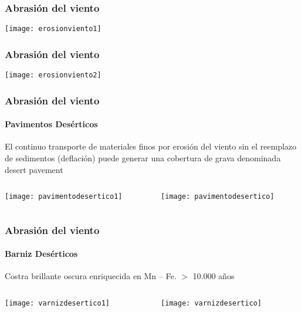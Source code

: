 \documentclass{beamer}
\begin{document}
\begin{frame}
\frametitle{Abrasión del viento}
\begin{center}
\texttt{[image: erosionviento1]}
\end{center}
\end{frame}
\begin{frame}
\frametitle{Abrasión del viento}
\begin{center}
\texttt{[image: erosionviento2]}
\end{center}
\end{frame}
\begin{frame}
\frametitle{Abrasión del viento}
\framesubtitle{Pavimentos Desérticos}
\small{El continuo transporte de materiales finos por erosión del viento sin el reemplazo de sedimentos (deflación) puede generar una cobertura de grava denominada desert pavement}
\begin{columns}
\begin{column}{0.5\linewidth}
\begin{center}
\texttt{[image: pavimentodesertico1]}
\end{center}
\end{column}
\begin{column}{0.5\linewidth}
\begin{center}
\texttt{[image: pavimentodesertico]}
\end{center}
\end{column}
\end{columns}
\end{frame}
\begin{frame}
\frametitle{Abrasión del viento}
\framesubtitle{Barniz Desérticos}
Costra brillante oscura enriquecida en Mn – Fe. $>$ 10.000 años
\begin{columns}
\begin{column}{0.5\linewidth}
\begin{center}
\texttt{[image: varnizdesertico1]}
\end{center}
\end{column}
\begin{column}{0.5\linewidth}
\begin{center}
\texttt{[image: varnizdesertico]}
\end{center}
\end{column}
\end{columns}
\end{frame}
\end{document}
